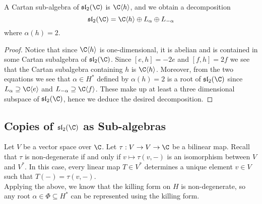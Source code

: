 \documentclass[a4paper]{article}
\begin{document}
\begin{eg}{}{} A Cartan sub-algebra of $\mathfrak{sl}_2(\C)$ is $\C\langle h\rangle$, and we obtain a decomposition $$\mathfrak{sl}_2(\C)=\C\langle h\rangle\oplus L_\alpha\oplus L_{-\alpha}$$ where $\alpha(h)=2$. \tcbline
\begin{proof}
Notice that since $\C\langle h\rangle$ is one-dimensional, it is abelian and is contained in some Cartan subalgebra of $\mathfrak{sl}_2(\C)$. Since $[e,h]=-2e$ and $[f,h]=2f$ we see that the Cartan subalgebra containing $h$ is $\C\langle h\rangle$. Moreover, from the two equations we see that $\alpha\in H^\ast$ defined by $\alpha(h)=2$ is a root of $\mathfrak{sl}_2(\C)$ since $L_\alpha\supseteq\C\langle e\rangle$ and $L_{-\alpha}\supseteq\C\langle f\rangle$. These make up at least a three dimensional subspace of $\mathfrak{sl}_2(\C)$, hence we deduce the desired decomposition. 
\end{proof}
\end{eg}

\subsection{Copies of $\mathfrak{sl}_2(\C)$ as Sub-algebras}
Let $V$ be a vector space over $\C$. Let $\tau:V\to V\to\C$ be a bilinear map. Recall that $\tau$ is non-degenerate if and only if $v\mapsto\tau(v,-)$ is an isomorphism between $V$ and $V^\ast$. In this case, every linear map $T\in V^\ast$ determines a unique element $v\in V$ such that $T(-)=\tau(v,-)$. \\

Applying the above, we know that the killing form on $H$ is non-degenerate, so any root $\alpha\in\Phi\subseteq H^\ast$ can be represented using the killing form. 
\end{document}
